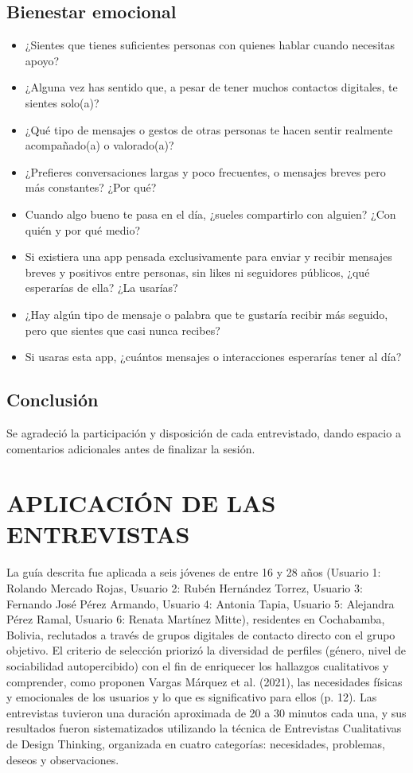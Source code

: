 \subsection{Bienestar emocional}
\begin{itemize}
    \item ¿Sientes que tienes suficientes personas con quienes hablar cuando necesitas apoyo?
    \item ¿Alguna vez has sentido que, a pesar de tener muchos contactos digitales, te sientes solo(a)?
    \item ¿Qué tipo de mensajes o gestos de otras personas te hacen sentir realmente acompañado(a) o valorado(a)?
    \item ¿Prefieres conversaciones largas y poco frecuentes, o mensajes breves pero más constantes? ¿Por qué?
    \item Cuando algo bueno te pasa en el día, ¿sueles compartirlo con alguien? ¿Con quién y por qué medio?
    \item Si existiera una app pensada exclusivamente para enviar y recibir mensajes breves y positivos entre personas, sin likes ni seguidores públicos, ¿qué esperarías de ella? ¿La usarías?
    \item ¿Hay algún tipo de mensaje o palabra que te gustaría recibir más seguido, pero que sientes que casi nunca recibes?
    \item Si usaras esta app, ¿cuántos mensajes o interacciones esperarías tener al día?
\end{itemize}

\subsection{Conclusión}
Se agradeció la participación y disposición de cada entrevistado, dando espacio a comentarios adicionales antes de finalizar la sesión.

\section{APLICACIÓN DE LAS ENTREVISTAS}
La guía descrita fue aplicada a seis jóvenes de entre 16 y 28 años (Usuario 1: Rolando Mercado Rojas, Usuario 2: Rubén Hernández Torrez, Usuario 3: Fernando José Pérez Armando, Usuario 4: Antonia Tapia, Usuario 5: Alejandra Pérez Ramal, Usuario 6: Renata Martínez Mitte), residentes en Cochabamba, Bolivia, reclutados a través de grupos digitales de contacto directo con el grupo objetivo. El criterio de selección priorizó la diversidad de perfiles (género, nivel de sociabilidad autopercibido) con el fin de enriquecer los hallazgos cualitativos y comprender, como proponen Vargas Márquez et al. (2021), las necesidades físicas y emocionales de los usuarios y lo que es significativo para ellos (p. 12). Las entrevistas tuvieron una duración aproximada de 20 a 30 minutos cada una, y sus resultados fueron sistematizados utilizando la técnica de Entrevistas Cualitativas de Design Thinking, organizada en cuatro categorías: necesidades, problemas, deseos y observaciones.

